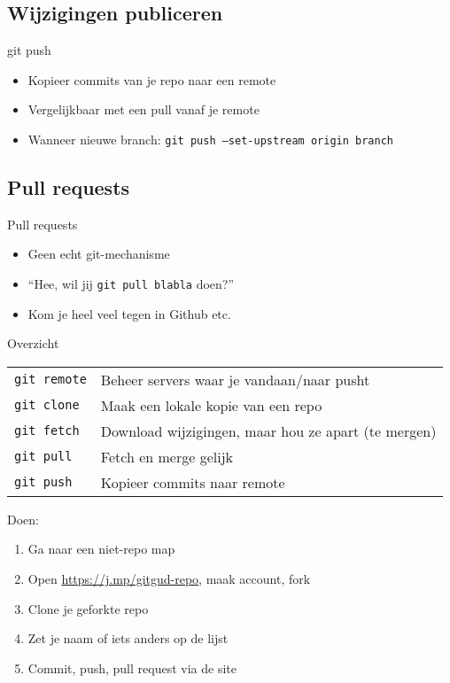 \subsection{Wijzigingen publiceren}
\begin{frame}{git push}
	\begin{itemize}
		\item Kopieer commits van je repo naar een remote
		\item Vergelijkbaar met een pull vanaf je remote
		\item Wanneer nieuwe branch: \texttt{git push --set-upstream origin branch}
	\end{itemize}
\end{frame}

\subsection{Pull requests}
\begin{frame}{Pull requests}
	\begin{itemize}
		\item Geen echt git-mechanisme
		\item ``Hee, wil jij \texttt{git pull blabla} doen?''
		\item Kom je heel veel tegen in Github etc.
	\end{itemize}
\end{frame}

\begin{frame}{Overzicht}
	\begin{tabular}{ll}
		\texttt{git remote}		& Beheer servers waar je vandaan/naar pusht\\
		\texttt{git clone}		& Maak een lokale kopie van een repo\\
		\texttt{git fetch}		& Download wijzigingen, maar hou ze apart (te mergen)\\
		\texttt{git pull}		& Fetch en merge gelijk\\
		\texttt{git push}		& Kopieer commits naar remote
	\end{tabular}
	Doen:
	\begin{enumerate}
		\item Ga naar een niet-repo map
		\item Open \url{https://j.mp/gitgud-repo}, maak account, fork
		\item Clone je geforkte repo
		\item Zet je naam of iets anders op de lijst
		\item Commit, push, pull request via de site
	\end{enumerate}
\end{frame}
